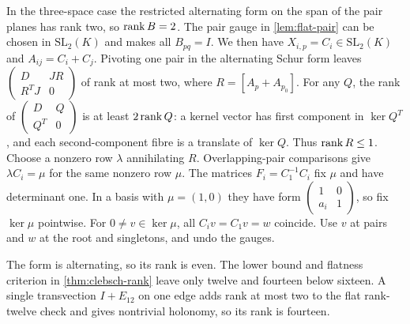 \begin{informalproof}
In the three-space case the restricted alternating form on the span
of the pair planes has rank two, so $\operatorname{rank} B=2$. The pair gauge in
\cref{lem:flat-pair} can be chosen in $\mathrm{SL}_2(K)$ and makes
all $B_{pq}=I$. We then have $X_{i,p}=C_i\in\mathrm{SL}_2(K)$ and
$A_{ij}=C_i+C_j$. Pivoting one pair in the alternating Schur form
leaves $\left(\begin{smallmatrix}D&JR\\R^TJ&0\end{smallmatrix}\right)$
of rank at most two, where $R=[A_p+A_{p_0}]$.
For any $Q$, the rank of
$\left(\begin{smallmatrix}D&Q\\Q^T&0\end{smallmatrix}\right)$ is
at least $2\operatorname{rank} Q$: a kernel vector has first component in
$\ker Q^T$, and each second-component fibre is a translate of
$\ker Q$. Thus $\operatorname{rank} R\le1$.
Choose a nonzero row $\lambda$ annihilating $R$. Overlapping-pair
comparisons give $\lambda C_i=\mu$ for the same nonzero row $\mu$.
The matrices $F_i=C_1^{-1}C_i$ fix $\mu$ and have determinant one.
In a basis with $\mu=(1,0)$ they have form
$\left(\begin{smallmatrix}1&0\\a_i&1\end{smallmatrix}\right)$,
so fix $\ker\mu$ pointwise. For $0\ne v\in\ker\mu$, all
$C_iv=C_1v=w$ coincide. Use $v$ at pairs and $w$ at the root and
singletons, and undo the gauges.

The form is alternating, so its rank is even. The lower bound and
flatness criterion in \cref{thm:clebsch-rank} leave only twelve and
fourteen below sixteen. A single transvection $I+E_{12}$ on one
edge adds rank at most two to the flat rank-twelve check and gives
nontrivial holonomy, so its rank is fourteen.
\end{informalproof}

